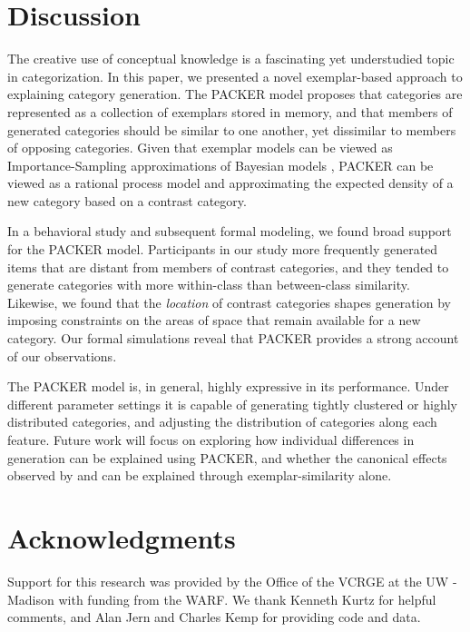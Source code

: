 \documentclass[10pt,letterpaper]{article}
\begin{document}
\section{Discussion}
The creative use of conceptual knowledge is a fascinating yet understudied topic in categorization. In this paper, we presented a novel exemplar-based approach to explaining category generation. The PACKER model proposes that categories are represented as a collection of exemplars stored in memory, and that members of generated categories should be similar to one another, yet dissimilar to members of opposing categories. Given that exemplar models can be viewed as Importance-Sampling approximations of Bayesian models \citep{shi10}, PACKER can be viewed as a rational process model and approximating the expected density of a new category based on a contrast category. 

In a behavioral study and subsequent formal modeling, we found broad support for the PACKER model. Participants in our study more frequently generated items that are distant from members of contrast categories, and they tended to generate categories with more within-class than between-class similarity. Likewise, we found that the \textit{location} of contrast categories shapes generation by imposing constraints on the areas of space that remain available for a new category. Our formal simulations reveal that PACKER provides a strong account of our observations.

The PACKER model is, in general, highly expressive in its performance. Under different parameter settings it is capable of generating tightly clustered or highly distributed categories, and adjusting the distribution of categories along each feature. Future work will focus on exploring how individual differences in generation can be explained using PACKER, and whether the canonical effects observed by \citet{ward1994structured} and \citet{jern2013probabilistic} can be explained through exemplar-similarity alone.

\section{Acknowledgments}
Support for this research was provided by the Office of the VCRGE at the UW - Madison with funding from the WARF. We thank Kenneth Kurtz for helpful comments, and Alan Jern and Charles Kemp for providing code and data.




\setlength{\bibleftmargin}{.025in}
\setlength{\bibindent}{-\bibleftmargin}

\end{document}
